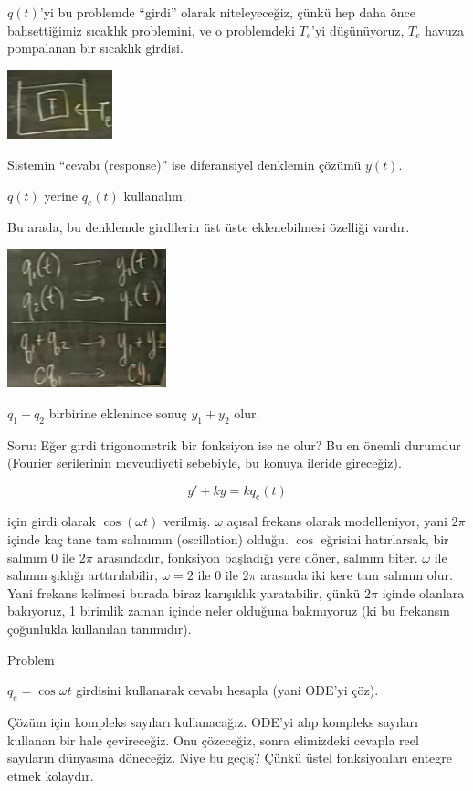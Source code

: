 \documentclass[12pt,fleqn]{article}\usepackage{../../common}
\begin{document}
$q(t)$'yi bu problemde ``girdi'' olarak niteleyeceğiz, çünkü hep daha önce
bahsettiğimiz sıcaklık problemini, ve o problemdeki $T_e$'yi düşünüyoruz,
$T_e$ havuza pompalanan bir sıcaklık girdisi. 

\includegraphics[height=2cm]{7_2.png}

Sistemin ``cevabı (response)'' ise diferansiyel denklemin çözümü $y(t)$. 

$q(t)$ yerine $q_e(t)$ kullanalım. 

Bu arada, bu denklemde girdilerin üst üste eklenebilmesi özelliği vardır.

\includegraphics[height=4cm]{7_3.png}

$q_1+q_2$ birbirine eklenince sonuç $y_1+y_2$ olur. 

Soru: Eğer girdi trigonometrik bir fonksiyon ise ne olur? Bu en önemli
durumdur (Fourier serilerinin mevcudiyeti sebebiyle, bu konuya ileride
gireceğiz). 

$$ y' + ky = kq_e(t) $$

için girdi olarak $\cos(\omega t)$ verilmiş. $\omega$ açısal frekans olarak
modelleniyor, yani $2\pi$ içinde kaç tane tam salınımın (oscillation)
olduğu. $\cos$ eğrisini hatırlarsak, bir salınım 0 ile $2\pi$ arasındadır,
fonksiyon başladığı yere döner, salınım biter. $\omega$ ile salınım şıklığı
arttırılabilir, $\omega = 2$ ile 0 ile $2\pi$ arasında iki kere tam salınım
olur. Yani frekans kelimesi burada biraz karışıklık yaratabilir, çünkü
$2\pi$ içinde olanlara bakıyoruz, 1 birimlik zaman içinde neler olduğuna
bakmıyoruz (ki bu frekansın çoğunlukla kullanılan tanımıdır). 

Problem

$q_e = \cos \omega t$ girdisini kullanarak cevabı hesapla (yani ODE'yi
çöz). 

Çözüm için kompleks sayıları kullanacağız. ODE'yi alıp kompleks sayıları
kullanan bir hale çevireceğiz. Onu çözeceğiz, sonra elimizdeki cevapla reel
sayıların dünyasına döneceğiz. Niye bu geçiş? Çünkü üstel fonksiyonları
entegre etmek kolaydır. 
\end{document}
